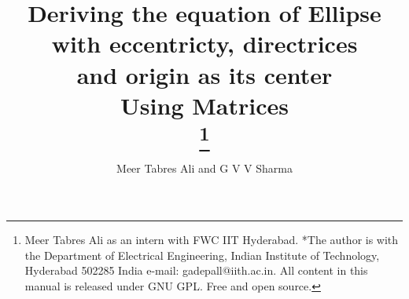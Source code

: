 \documentclass[journal,10pt,twocolumn]{article}
\begin{document}
\newtheorem{theorem}{Theorem}[section]
\newtheorem{problem}{Problem}
\newtheorem{proposition}{Proposition}[section]
\newtheorem{lemma}{Lemma}[section]
\newtheorem{corollary}[theorem]{Corollary}
\newtheorem{example}{Example}[section]
\newtheorem{definition}[problem]{Definition}
\newcommand{\BEQA}{\begin{eqnarray}}
\newcommand{\EEQA}{\end{eqnarray}}
\newcommand{\define}{\stackrel{\triangle}{=}}
\newcommand*\circled[1]{\tikz[baseline=(char.base)]{
    \node[shape=circle,draw,inner sep=2pt] (char) {#1};}}

%
\providecommand{\mbf}{\mathbf}
\providecommand{\pr}[1]{\ensuremath{\Pr\left(#1\right)}}
\providecommand{\re}[1]{\ensuremath{\text{Re}\left(#1\right)}}
\providecommand{\im}[1]{\ensuremath{\text{Im}\left(#1\right)}}
\providecommand{\qfunc}[1]{\ensuremath{Q\left(#1\right)}}
\providecommand{\sbrak}[1]{\ensuremath{{}\left[#1\right]}}
\providecommand{\lsbrak}[1]{\ensuremath{{}\left[#1\right.}}
\providecommand{\rsbrak}[1]{\ensuremath{{}\left.#1\right]}}
\providecommand{\brak}[1]{\ensuremath{\left(#1\right)}}
\providecommand{\lbrak}[1]{\ensuremath{\left(#1\right.}}
\providecommand{\rbrak}[1]{\ensuremath{\left.#1\right)}}
\providecommand{\cbrak}[1]{\ensuremath{\left\{#1\right\}}}
\providecommand{\lcbrak}[1]{\ensuremath{\left\{#1\right.}}
\providecommand{\rcbrak}[1]{\ensuremath{\left.#1\right\}}}
\newcommand{\sgn}{\mathop{\mathrm{sgn}}}
\providecommand{\system}{\overset{\mathcal{H}}{ \longleftrightarrow}}
\newcommand{\solution}{\noindent \textbf{Solution: }}
\newcommand{\cosec}{\,\text{cosec}\,}
\providecommand{\dec}[2]{\ensuremath{\overset{#1}{\underset{#2}{\gtrless}}}}
\newcommand{\myvec}[1]{\ensuremath{\begin{pmatrix}#1\end{pmatrix}}}
\newcommand{\mydet}[1]{\ensuremath{\begin{vmatrix}#1\end{vmatrix}}}
	\newcommand*{\permcomb}[4][0mu]{{{}^{#3}\mkern#1#2_{#4}}}
\newcommand*{\perm}[1][-3mu]{\permcomb[#1]{P}}
\newcommand*{\comb}[1][-1mu]{\permcomb[#1]{C}}
\let\vec\mathbf
\title{
{Deriving the equation of Ellipse with eccentricty, directrices\\
and origin as its center\\
Using Matrices}\\
\thanks{Meer Tabres Ali as an intern with FWC IIT Hyderabad. *The author is with the Department of Electrical Engineering, Indian Institute of Technology, Hyderabad 502285 India e-mail: gadepall@iith.ac.in. All content in this manual is released under GNU GPL. Free and open source.}
}
\author{Meer Tabres Ali and G V V Sharma}
\maketitle
\tableofcontents
\end{document}
